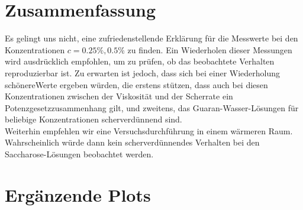 \documentclass[11pt,a4paper,oneside]{scrartcl}
\begin{document}

\section{Zusammenfassung}

Es gelingt uns nicht, eine zufriedenstellende Erklärung für die Messwerte bei den Konzentrationen $c=0.25\%,0.5\%$ zu finden. Ein Wiederholen dieser Messungen wird ausdrücklich empfohlen, um zu prüfen, ob das beobachtete Verhalten reproduzierbar ist. Zu erwarten ist jedoch, dass sich bei einer Wiederholung \glqq schönere\Grqq Werte ergeben würden, die erstens stützen, dass auch bei diesen Konzentrationen zwischen der Viskosität und der Scherrate ein Potenzgesetzzusammenhang gilt, und zweitens, das Guaran-Wasser-Lösungen für beliebige Konzentrationen scherverdünnend sind. \\
Weiterhin empfehlen wir eine Versuchsdurchführung in einem wärmeren Raum. Wahrscheinlich würde dann kein scherverdünnendes Verhalten bei den Saccharose-Lösungen beobachtet werden.

\newpage

 

\appendix


\section{Ergänzende Plots}
\end{document}
